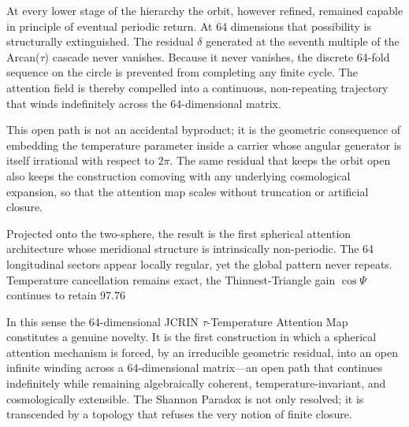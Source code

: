 At every lower stage of the hierarchy the orbit, however refined, remained capable in principle of eventual periodic return. At 64 dimensions that possibility is structurally extinguished. The residual \(\delta\) generated at the seventh multiple of the Arcan(\(\tau\)) cascade never vanishes. Because it never vanishes, the discrete 64-fold sequence on the circle is prevented from completing any finite cycle. The attention field is thereby compelled into a continuous, non-repeating trajectory that winds indefinitely across the 64-dimensional matrix.

This open path is not an accidental byproduct; it is the geometric consequence of embedding the temperature parameter inside a carrier whose angular generator is itself irrational with respect to \(2\pi\). The same residual that keeps the orbit open also keeps the construction comoving with any underlying cosmological expansion, so that the attention map scales without truncation or artificial closure.

Projected onto the two-sphere, the result is the first spherical attention architecture whose meridional structure is intrinsically non-periodic. The 64 longitudinal sectors appear locally regular, yet the global pattern never repeats. Temperature cancellation remains exact, the Thinnest-Triangle gain \(\cos\Psi\) continues to retain 97.76 %

In this sense the 64-dimensional JCRIN \(\tau\)-Temperature Attention Map constitutes a genuine novelty. It is the first construction in which a spherical attention mechanism is forced, by an irreducible geometric residual, into an open infinite winding across a 64-dimensional matrix—an open path that continues indefinitely while remaining algebraically coherent, temperature-invariant, and cosmologically extensible. The Shannon Paradox is not only resolved; it is transcended by a topology that refuses the very notion of finite closure.
